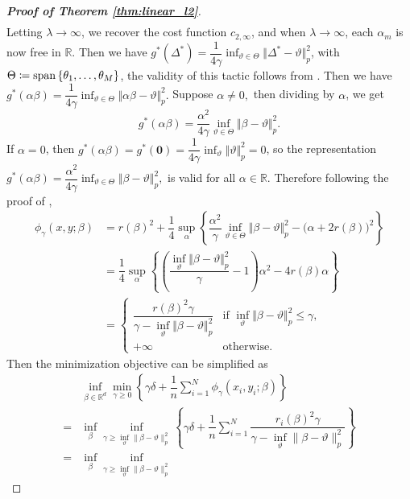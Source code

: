 \documentclass[12pt]{article}
\begin{document}
\begin{proof}[\textbf{Proof of Theorem \ref{thm:linear_l2}}]
\begin{align*}
\end{align*}Letting $\lambda \to\infty$, we recover the cost function $c_{2,\infty}$, and when $\lambda \to \infty$, each $\alpha_m$ is now free in $\mathbb{R}$. Then we have $g^*(\Delta^*) = \dfrac{1}{4\gamma} \inf_{\vartheta \in \Theta} \Vert\Delta^* -\vartheta\Vert_p^2$, with $\Theta \coloneqq \operatorname{span}{\{\theta_1,\ldots,\theta_M\}}$, the validity of this tactic follows from \citep[Theorem 1, Section 13.1]{luenberger2008linear}. Then we have $g^*(\alpha\beta) = \dfrac{1}{4\gamma}\inf_{\vartheta\in\Theta} \Vert \alpha \beta - \vartheta\Vert_p^2.$ Suppose $\alpha \neq 0,$ then dividing by $\alpha$, we get \[
g^*(\alpha\beta) = \dfrac{\alpha^2}{4\gamma}\inf_{\vartheta\in\Theta}\Vert \beta - \vartheta\Vert_p^2.
\]If $\alpha = 0$, then $g^*(\alpha\beta) = g^*(\boldsymbol{0}) = \dfrac{1}{4\gamma}\inf_\vartheta \Vert\vartheta\Vert_p^2 = 0$, so the representation $g^*(\alpha\beta) = \dfrac{\alpha^2}{4\gamma}\inf_{\vartheta\in\Theta}\Vert \beta - \vartheta\Vert_p^2,$ is valid for all $\alpha\in\mathbb{R}$. Therefore following the proof of \citep[Theorem 1]{blanchet2019rwpi}, \begin{align*}
    \phi_\gamma(x,y;\beta) &= r(\beta)^2 + \dfrac{1}{4}\sup_{\alpha} \left\{\dfrac{\alpha^2}{\gamma}\inf_{\vartheta\in\Theta} \Vert \beta - \vartheta\Vert_p^2-\big(\alpha +  2r(\beta)\big)^2\right\}\\
    &=\dfrac{1}{4}\sup_{\alpha}\left\{\left(\dfrac{\inf_\vartheta\Vert \beta - \vartheta\Vert_p^2}{\gamma}-1\right)\alpha^2 - 4r(\beta)\alpha\right\}\\
    &= \begin{cases}
        \dfrac{r(\beta)^2\gamma}{\gamma-\inf_\vartheta\Vert\beta-\vartheta\Vert_p^2} &\text{if }\inf_\vartheta\Vert\beta-\vartheta\Vert_p^2 \leq \gamma,\\
        +\infty&\text{otherwise.}
    \end{cases}
\end{align*}
Then the minimization objective can be simplified as \begin{align*}
  &\inf_{\beta \in \mathbb{R}^d} \min_{\gamma \geq 0} 
\left\{
\gamma \delta + \dfrac{1}{n} \sum_{i=1}^N \phi_\gamma(x_i, y_i; \beta)
\right\}\\
= &\inf_{\beta} \inf_{\gamma \geq \inf_\vartheta \lVert \beta - \vartheta \rVert_p^2} 
\left\{
\gamma \delta + \dfrac{1}{n} \sum_{i=1}^N \dfrac{r_i(\beta)^2 \gamma}{\gamma - \inf_\vartheta \lVert \beta - \vartheta \rVert_p^2}
\right\}\\
=&\inf_\beta \inf_{\gamma \geq \inf_\vartheta \lVert \beta - \vartheta \rVert_p^2} 

\end{align*}
\end{proof}
\end{document}
